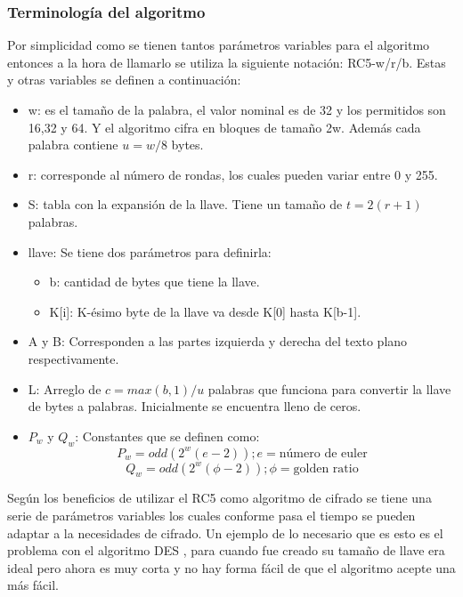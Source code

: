 \subsubsection{Terminología del algoritmo}
Por simplicidad como se tienen tantos parámetros variables para el algoritmo entonces a la hora de llamarlo se utiliza la siguiente notación: RC5-w/r/b. Estas y otras variables se definen a continuación:

\begin{itemize}
\item w: es el tamaño de la palabra, el valor nominal es de 32 y los permitidos son 16,32 y 64. Y el algoritmo cifra en bloques de tamaño 2w. Además cada palabra contiene $u=w/8$ bytes.

\item r: corresponde al número de rondas, los cuales pueden variar entre 0 y 255. 
\item S: tabla con la expansión de la llave. Tiene un tamaño de $t= 2(r+1)$ palabras.

\item llave: Se tiene dos parámetros para definirla:
\begin{itemize}
\item b: cantidad de bytes que tiene la llave.
\item K[i]: K-ésimo byte de la llave va desde K[0] hasta K[b-1].
\end{itemize}

\item A y B: Corresponden a las partes izquierda y derecha del texto plano respectivamente.

\item L: Arreglo de $c=max(b,1)/u$ palabras que funciona para convertir la llave de bytes a palabras. Inicialmente se encuentra lleno de ceros.

\item $P_w$ y $Q_w$: Constantes que se definen como:
\begin{equation}
P_w = odd(2^w(e-2)); e = \text{número de euler}
\end{equation}
\begin{equation}
Q_w = odd(2^w(\phi-2)); \phi = \text{golden ratio}
\end{equation}
\end{itemize}



Según \cite{rivest} los beneficios de utilizar el RC5 como algoritmo de cifrado se tiene una serie de parámetros variables los cuales conforme pasa el tiempo se pueden adaptar a la necesidades de cifrado. Un ejemplo de lo necesario que es esto es el problema con el algoritmo DES , para cuando fue creado su tamaño de llave era ideal pero ahora es muy corta y no hay forma fácil de que el algoritmo acepte una más fácil.

